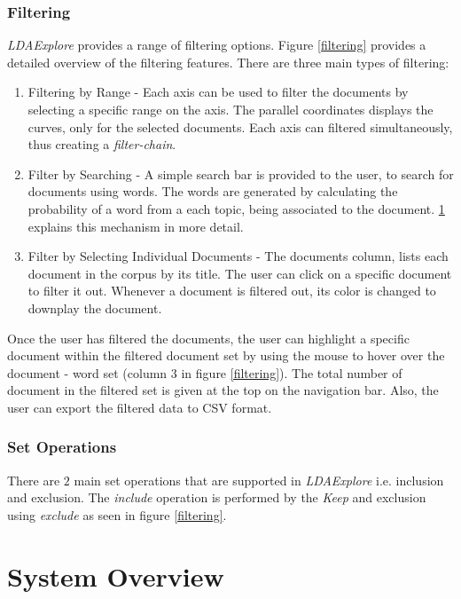 \documentclass[10pt,journal,compsoc]{IEEEtran}
\begin{document}
\subsubsection{Filtering}
\textit{LDAExplore} provides a range of filtering options. Figure \ref{filtering} provides a detailed overview of the filtering features. There are three main types of filtering:
\begin{enumerate}
\item Filtering by Range - Each axis can be used to filter the documents by selecting a specific range on the axis. The parallel coordinates displays the curves, only for the selected documents. Each axis can filtered simultaneously, thus creating a \textit{filter-chain}.
\item Filter by Searching - A simple search bar is provided to the user, to search for documents using words. The words are generated by calculating the probability of a word from a each topic, being associated to the document. \ref{sec:sysoverview} explains this mechanism in more detail.
\item Filter by Selecting Individual Documents - The documents column, lists each document in the corpus by its title. The user can click on a specific document to filter it out. Whenever a document is filtered out, its color is changed to downplay the document.
\end{enumerate}

Once the user has filtered the documents, the user can highlight a specific document within the filtered document set by using the mouse to hover over the document - word set (column 3 in figure \ref{filtering}). The total number of document in the filtered set is given at the top on the navigation bar. Also, the user can export the filtered data to CSV format. 

\subsubsection{Set Operations}
There are $2$ main set operations that are supported in \textit{LDAExplore} i.e. inclusion and exclusion. The \textit{include} operation is performed by the \textit{Keep} and exclusion using \textit{exclude} as seen in figure \ref{filtering}.

\section{System Overview}


\label{sec:sysoverview}
\end{document}
